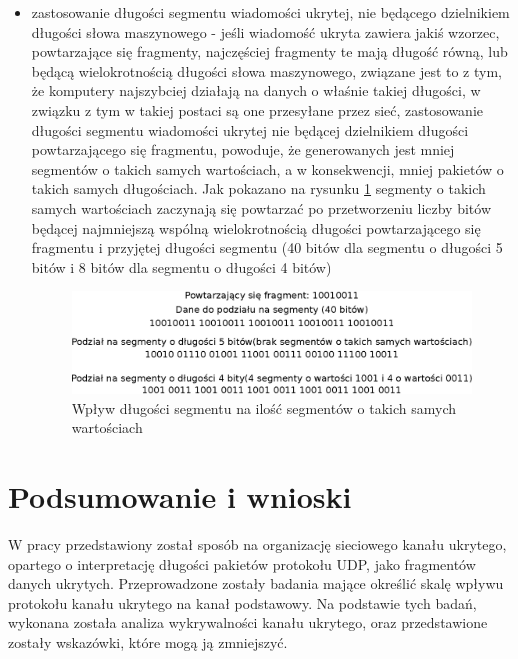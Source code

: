\documentclass[a4paper, twoside, 12pt]{report}
\begin{document}
\begin{itemize}
           \item zastosowanie długości segmentu wiadomości ukrytej, nie będącego
               dzielnikiem długości słowa maszynowego - jeśli wiadomość ukryta
               zawiera jakiś wzorzec, powtarzające się fragmenty, najczęściej fragmenty
               te mają długość równą, lub będącą wielokrotnością długości słowa maszynowego,
               związane jest to z tym, że komputery najszybciej działają na danych
               o właśnie takiej długości, w związku z tym w takiej postaci są one przesyłane
               przez sieć, zastosowanie długości segmentu wiadomości ukrytej nie będącej
               dzielnikiem długości powtarzającego się fragmentu, powoduje, że generowanych
               jest mniej segmentów o takich samych wartościach, a w konsekwencji,
               mniej pakietów o takich samych długościach. Jak pokazano na rysunku \ref{REPETEDFRAGMENTS}
               segmenty o takich samych wartościach zaczynają się powtarzać po
               przetworzeniu liczby bitów będącej najmniejszą wspólną wielokrotnością
               długości powtarzającego się fragmentu i przyjętej długości segmentu
               (40 bitów dla segmentu o długości 5 bitów i 8 bitów dla segmentu o
               długości 4 bitów)

                \begin{figure}[h]
                        \centering
                        \includegraphics[scale=0.75]{powtorzone_fragmenty}
                        \caption{Wpływ długości segmentu na ilość segmentów o takich samych wartościach}
                        \label{REPETEDFRAGMENTS}
                \end{figure}
       \end{itemize}


\chapter{Podsumowanie i wnioski}
    W pracy przedstawiony został sposób na organizację sieciowego kanału ukrytego,
    opartego o interpretację długości pakietów protokołu UDP, jako fragmentów
    danych ukrytych. Przeprowadzone zostały badania mające określić skalę wpływu
    protokołu kanału ukrytego na kanał podstawowy. Na podstawie tych badań, wykonana
    została analiza wykrywalności kanału ukrytego, oraz przedstawione zostały wskazówki,
    które mogą ją zmniejszyć.
\end{document}
